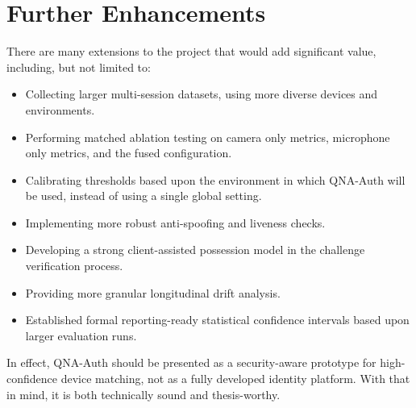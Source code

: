 \section{Further Enhancements}
There are many extensions to the project that would add significant value, including, but not limited to: 
\begin{itemize}
	\item Collecting larger multi-session datasets, using more diverse devices and environments.
	\item Performing matched ablation testing on camera only metrics, microphone only metrics, and the fused configuration.
	\item Calibrating thresholds based upon the environment in which QNA-Auth will be used, instead of using a single global setting.
	\item Implementing more robust anti-spoofing and liveness checks.
	\item Developing a strong client-assisted possession model in the challenge verification process.
	\item Providing more granular longitudinal drift analysis.
	\item Established formal reporting-ready statistical confidence intervals based upon larger evaluation runs.
\end{itemize}

In effect, QNA-Auth should be presented as a security-aware prototype for high-confidence device matching, not as a fully developed identity platform. With that in mind, it is both technically sound and thesis-worthy.